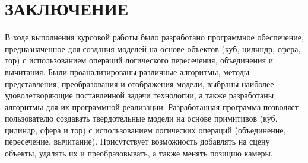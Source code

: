 \section*{ЗАКЛЮЧЕНИЕ}
В  ходе  выполнения  курсовой работы  было  разработано  программное обеспечение, предназначенное для создания моделей на основе объектов (куб, цилиндр, сфера, тор) с использованием операций логического пересечения, объединения и 
вычитания.  
Были  проанализированы  различные  алгоритмы,  методы  представления, 
преобразования  и  отображения  модели,  выбраны  наиболее  удоволетворяющие  поставленной  задачи  технологии,  а  также  разработаны  алгоритмы  для  их 
программной реализации. 
Разработанная программа позволяет пользователю создавать твердотельные модели на основе примитивов (куб, цилиндр, сфера и тор) с использованием логических операций (объединение, пересечение, вычитание). Присутствует возможность добавлять на сцену объекты, удалять их и преобразовывать, а также менять позицию камеры.
\pagebreak